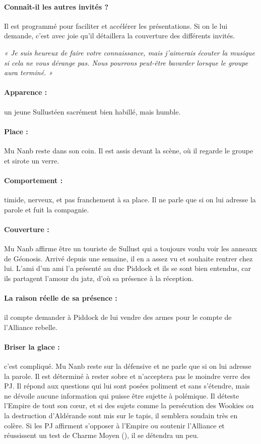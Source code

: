 \documentclass[a4paper,10pt,twoside,twocolumn,openany]{book}
\begin{document}
\paragraph{Connaît-il les autres invités ?} Il est programmé pour
faciliter et accélérer les présentations. Si on le lui demande, c’est avec joie qu’il détaillera la couverture des
différents invités.

\subtitle{MU NANB}
\emph{« Je suis heureux de faire votre connaissance, mais
j’aimerais écouter la musique si cela ne vous dérange
pas. Nous pourrons peut-être bavarder lorsque le
groupe aura terminé. »}
\paragraph{Apparence :} un jeune Sullustéen sacrément bien habillé,
mais humble.
\paragraph{Place :} Mu Nanb reste dans son coin. Il est assis devant
la scène, où il regarde le groupe et sirote un verre.
\paragraph{Comportement :} timide, nerveux, et pas franchement à
sa place. Il ne parle que si on lui adresse la parole et fuit
la compagnie.

\paragraph{Couverture :} Mu Nanb affirme être un touriste de Sullust
qui a toujours voulu voir les anneaux de Géonosis. Arrivé
depuis une semaine, il en a assez vu et souhaite rentrer
chez lui. L’ami d’un ami l’a présenté au duc Piddock et ils
se sont bien entendus, car ils partagent l’amour du jatz,
d’où sa présence à la réception.

\paragraph{La raison réelle de sa présence :} il compte demander
à Piddock de lui vendre des armes pour le compte de
l’Alliance rebelle.

\paragraph{Briser la glace :} c’est compliqué. Mu Nanb reste sur la
défensive et ne parle que si on lui adresse la parole. Il est
déterminé à rester sobre et n’acceptera pas le moindre
verre des PJ. Il répond aux questions qui lui sont posées
poliment et sans s’étendre, mais ne dévoile aucune information qui puisse être sujette à polémique. Il déteste
l’Empire de tout son cœur, et si des sujets comme la persécution des Wookies ou la destruction d’Aldérande sont
mis sur le tapis, il semblera soudain très en colère. Si les
PJ affirment s’opposer à l’Empire ou soutenir l’Alliance
et réussissent un test de Charme Moyen (\difficulty \difficulty), il se
détendra un peu.
\end{document}
